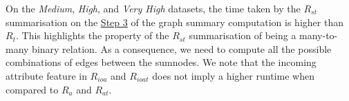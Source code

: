 On the \emph{Medium}, \emph{High}, and \emph{Very High} datasets, the time taken by the $R_{st}$ summarisation on the \hyperref[step-he]{Step 3} of the graph summary computation is higher than $R_t$. This highlights the property of the $R_{st}$ summarisation of being a many-to-many binary relation. As a consequence, we need to compute all the possible combinations of edges between the sumnodes.
We note that the incoming attribute feature in $R_{ioa}$ and $R_{ioat}$ does not imply a higher runtime when compared to $R_{a}$ and $R_{at}$.

\begin{table}
	\centering
	\resizebox{\textwidth}{!}{
		
	}
	\caption{Performance comparison. We report the CPU time in $ms$ of the \emph{edges} step in the graph summarisation computation. For each category of dataset complexity, we report the mean $\mu$ of the CPU time.%
	}
	\label{tab:cpu-time}
\end{table}
